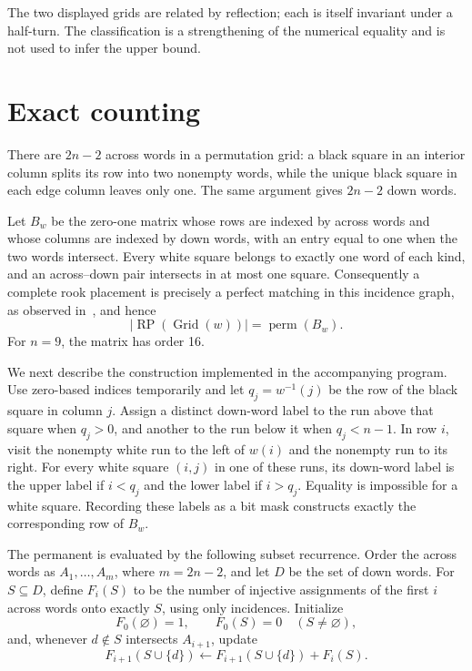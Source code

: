 \documentclass[11pt]{article}
\newcommand{\RP}{\operatorname{RP}}
\newcommand{\Grid}{\operatorname{Grid}}
\newcommand{\perm}{\operatorname{perm}}
\begin{document}
The two displayed grids are related by reflection; each is itself invariant
under a half-turn.  The classification is a strengthening of the numerical
equality and is not used to infer the upper bound.

\section{Exact counting}

There are $2n-2$ across words in a permutation grid: a black square in an
interior column splits its row into two nonempty words, while the unique black
square in each edge column leaves only one.  The same argument gives $2n-2$
down words.

Let $B_w$ be the zero-one matrix whose rows are indexed by across words and
whose columns are indexed by down words, with an entry equal to one when the
two words intersect.  Every white square belongs to exactly one word of each
kind, and an across--down pair intersects in at most one square.  Consequently
a complete rook placement is precisely a perfect matching in this incidence
graph, as observed in~\cite[Section~2]{LewisWon2026}, and hence
\begin{equation}\label{eq:permanent}
  |\RP(\Grid(w))|=\perm(B_w).
\end{equation}
For $n=9$, the matrix has order 16.

We next describe the construction implemented in the accompanying program.
Use zero-based indices temporarily and let $q_j=w^{-1}(j)$ be the row of the
black square in column $j$.  Assign a distinct down-word label to the run
above that square when $q_j>0$, and another to the run below it when
$q_j<n-1$.  In row $i$, visit the nonempty white run to the left of $w(i)$
and the nonempty run to its right.  For every white square $(i,j)$ in one of
these runs, its down-word label is the upper label if $i<q_j$ and the lower
label if $i>q_j$.  Equality is impossible for a white square.  Recording
these labels as a bit mask constructs exactly the corresponding row of
$B_w$.

The permanent is evaluated by the following subset recurrence.  Order the
across words as $A_1,\ldots,A_m$, where $m=2n-2$, and let $D$ be the set of
down words.  For $S\subseteq D$, define $F_i(S)$ to be the number of
injective assignments of the first $i$ across words onto exactly $S$, using
only incidences.  Initialize
\[
  F_0(\varnothing)=1,
  \qquad F_0(S)=0\quad(S\neq\varnothing),
\]
and, whenever $d\notin S$ intersects $A_{i+1}$, update
\begin{equation}\label{eq:dp}
  F_{i+1}(S\cup\{d\})\leftarrow F_{i+1}(S\cup\{d\})+F_i(S).
\end{equation}
\end{document}

